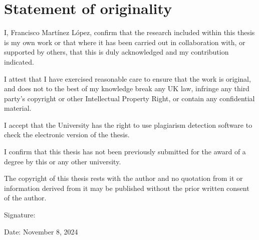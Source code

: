 \chapter*{Statement of originality}
\label{C:Statement}

I, Francisco Mart\'{i}nez L\'{o}pez, confirm that the research included
within this thesis is my own work or that where it has been carried out in collaboration with, or supported by others, that this is duly acknowledged and my contribution indicated.

\bigskip

\noindent
I attest that I have exercised reasonable care to ensure that the work is
original, and does not to the best of my knowledge break any UK law, infringe any third party's copyright or other Intellectual Property Right, or contain any confidential material.

\bigskip

\noindent
I accept that the University has the right to use plagiarism detection software to check the electronic version of the thesis.

\bigskip

\noindent
I confirm that this thesis has not been previously submitted for the award of a degree by this or any other university.

\bigskip

\noindent
The copyright of this thesis rests with the author and no quotation from it or information derived from it may be published without the prior written consent of the author.

\bigskip

\noindent
Signature:
\vspace{3cm}

\noindent
Date: November 8, 2024

\bigskip